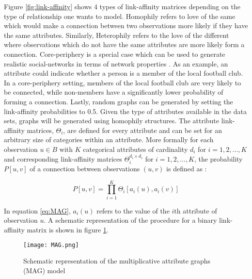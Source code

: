 	\noindent Figure \ref{fig:link-affinity} shows 4 types of link-affinity
	matrices depending on the type of relationship one wants to model. Homophily 
	refers to love of the same which would make a connection between two
	observations more likely if they have the same attributes. Similarly,
	Heterophily refers to the love of the different where observations which do 
	not have the same attributes are more likely form a connection. 
	Core-periphery is a special case which can be used to generate realistic 
	social-networks in terms of network properties 
	\citep[p. 139]{kim2012multiplicative}. As an example, an attribute could
	indicate whether a person is a member of the local football club. In a
	core-periphery setting, members of the local football club are very likely
	to be connected, while non-members have a significantly lower probability
	of forming a connection. Lastly, random graphs can be generated by setting the
	link-affinity probabilities to 0.5. Given the type of attributes available
	in the data sets, graphs will be generated using homophily structures. The 
	attribute link-affinity matrices, $\Theta_i$, are defined for every attribute 
	and can be set for an arbitrary size of categories within an attribute. 
	More formally for each observation $u \in B$ with $K$ categorical attributes 
	of cardinality $d_i$ for $i = 1,2,\dots,K$ and corresponding link-affinity 
	matrices $\Theta_{i}^{d_{i} \times d_{i}}$ for $i=1,2,\dots,K$, the probability 
	$P[u,v]$ of a connection between observations $(u,v)$ is defined as 
	\citep[p. 119]{kim2012multiplicative}:

	\begin{equation}
		P[u,v] = \prod_{i=1}^{K}\Theta_{i}\left[a_{i}(u),a_i(v)\right]
		\label{eq:MAG}
	\end{equation}

	\noindent In equation \ref{eq:MAG}, $a_{i}(u)$ refers to the value of the 
	$i$th attribute of observation $u$. A schematic representation of the 
	procedure for a binary link-affinity matrix is shown in figure \ref{fig:MAG}.

	\begin{figure}[h]
		\centering
		\texttt{[image: MAG.png]}
		\caption{Schematic representation of the 
			multiplicative attribute graphs (MAG) model}
		\cite[p. 120]{kim2012multiplicative}
		\label{fig:MAG}
	\end{figure}
	

